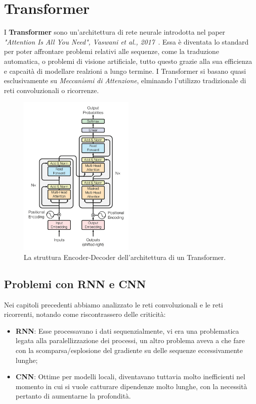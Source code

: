 \chapter{Transformer}\label{cap:14}

I \textbf{Transformer} sono un'architettura di rete neurale introdotta nel paper \textit{"Attention Is All You Need", Vaswani et al., 2017}~\cite{vaswani2017attention}. Essa è diventata lo standard per poter affrontare problemi relativi alle sequenze, come la traduzione automatica, o problemi di visione artificiale, tutto questo grazie alla sua efficienza e capcaità di modellare realzioni a lungo termine. I Transformer si basano quasi esclusivamente su \textit{Meccanismi di Attenzione}, elminando l'utilizzo tradizionale di reti convoluzionali o ricorrenze.

\begin{figure}
    \centering
    \includegraphics[width=0.5\textwidth]{figure/TransformerArch.png}
    \caption{La struttura Encoder-Decoder dell'architettura di un Transformer.}
    \label{fig:tranArch}
\end{figure}

\section{Problemi con RNN e CNN}
Nei capitoli precedenti abbiamo analizzato le reti convoluzionali e le reti ricorrenti, notando come riscontrassero delle criticità:
\begin{itemize}
    \item \textbf{RNN}: Esse processavano i dati sequenzialmente, vi era una problematica legata alla paralellizzazione dei processi, un altro problema aveva a che fare con la scomparsa/esplosione del gradiente su delle sequenze eccessivamente lunghe;
    \item \textbf{CNN}: Ottime per modelli locali, diventavano tuttavia molto inefficienti nel momento in cui si vuole catturare dipendenze molto lunghe, con la necessità pertanto di aumentarne la profondità.
\end{itemize}

